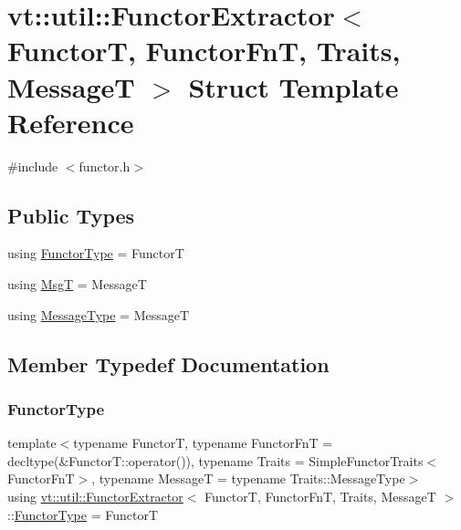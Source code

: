 \hypertarget{structvt_1_1util_1_1_functor_extractor}{}\section{vt\+:\+:util\+:\+:Functor\+Extractor$<$ FunctorT, Functor\+FnT, Traits, MessageT $>$ Struct Template Reference}
\label{structvt_1_1util_1_1_functor_extractor}


{\ttfamily \#include $<$functor.\+h$>$}

\subsection*{Public Types}
\begin{DoxyCompactItemize}
\item 
using \hyperlink{structvt_1_1util_1_1_functor_extractor_a9a48c3c982d2582c54a91584d3a02dda}{Functor\+Type} = FunctorT
\item 
using \hyperlink{structvt_1_1util_1_1_functor_extractor_a6806fe1c31dcbaaeb42221844a396caa}{MsgT} = MessageT
\item 
using \hyperlink{structvt_1_1util_1_1_functor_extractor_a6da3f67871dbf871f832dd5efad726d4}{Message\+Type} = MessageT
\end{DoxyCompactItemize}


\subsection{Member Typedef Documentation}
\mbox{\label{structvt_1_1util_1_1_functor_extractor_a9a48c3c982d2582c54a91584d3a02dda}} 
\subsubsection{\texorpdfstring{Functor\+Type}{FunctorType}}
{\footnotesize\ttfamily template$<$typename FunctorT, typename Functor\+FnT = decltype(\&\+Functor\+T\+::operator()), typename Traits = Simple\+Functor\+Traits$<$\+Functor\+Fn\+T$>$, typename MessageT = typename Traits\+::\+Message\+Type$>$ \\
using \hyperlink{structvt_1_1util_1_1_functor_extractor}{vt\+::util\+::\+Functor\+Extractor}$<$ FunctorT, Functor\+FnT, Traits, MessageT $>$\+::\hyperlink{structvt_1_1util_1_1_functor_extractor_a9a48c3c982d2582c54a91584d3a02dda}{Functor\+Type} =  FunctorT}

